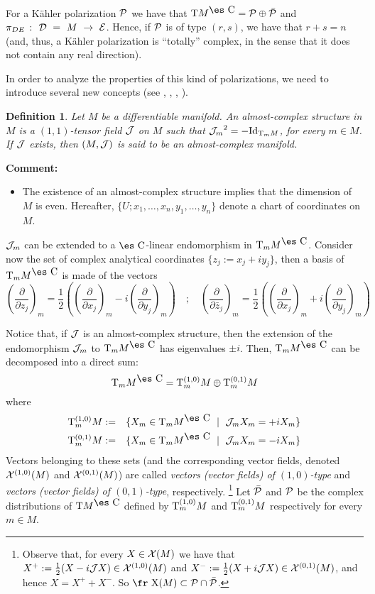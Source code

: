 \documentclass[12pt]{article}
\theoremstyle{plain}
\newtheorem{definition}{Definition}
\def\beann{\begin{eqnarray*}}
\def\eeann{\end{eqnarray*}}
\def\derpar#1#2{\frac{\partial{#1}}{\partial{#2}}}
\def\vf{\mbox{\fr X}}
\def\P{{\cal P}}
\def\D{{\cal D}}
\def\E{{\cal E}}
\def\Complex{\mbox{\es C}}
\def\Tan{{\rm T}}
\begin{document}
For a K\"ahler polarization $\P$ we have that
$\Tan M^{\Complex} = \P \oplus \bar \P$
and $\pi_{DE}~\colon~\D~=~M~\to~\E$.
Hence, if $\P$ is of type $(r,s)$,
we have that $r+s=n$
(and, thus, a K\"ahler polarization is ``totally'' complex,
in the sense that it does not contain any real direction).

In order to analyze the properties of this kind of polarizations,
we need to introduce several new concepts
(see \cite{GS-77}, \cite{Ib-90}, \cite{Ok-87}, \cite{Wo-80}).

\begin{definition}
Let $M$ be a differentiable manifold.
An {\rm almost-complex structure} in $M$ is a $(1,1)$-tensor field
${\cal J}$ on $M$
such that ${{\cal J}_m}^2=-{\rm Id}_{\Tan_m M}$, for every $m \in M$.
If ${\cal J}$ exists, then $(M,{\cal J})$ is said to be an
{\rm almost-complex manifold}.
\end{definition}

{\bf Comment:}
\begin{itemize}
\item
The existence of an almost-complex structure
implies that the dimension of $M$ is even.
Hereafter, $\{ U; x_1,\ldots ,x_n,y_1,\ldots ,y_n\}$
denote a chart of coordinates on $M$.
\end{itemize}

${\cal J}_m$ can be extended to a $\Complex$-linear endomorphism
in $\Tan_m M^{\Complex}$.
Consider now the set of complex analytical coordinates
$\{ z_j := x_j+iy_j \}$,
then a basis of $\Tan_m M^{\Complex}$ is made of the vectors
$$
\left(\derpar{}{z_j}\right)_m = \frac{1}{2} \left(
\left(\derpar{}{x_j}\right)_m -i\left(\derpar{}{y_j}\right)_m \right)
\quad ; \quad
\left(\derpar{}{\bar z_j}\right)_m = \frac{1}{2} \left(
\left(\derpar{}{x_j}\right)_m +i\left(\derpar{}{y_j}\right)_m \right)
$$

Notice that, if ${\cal J}$ is an almost-complex structure, then
the extension of the endomorphism ${\cal J}_m$ to
$\Tan_mM^{\Complex}$ has eigenvalues $\pm i$. Then, $\Tan_m
M^{\Complex}$ can be decomposed into a direct sum: $$ \Tan_m
M^{\Complex} = \Tan_m^{(1,0)} M \oplus \Tan_m^{(0,1)} M $$ where
\beann \Tan_m^{(1,0)}M&:=&\{X_m \in \Tan_m M^{\Complex}\ \mid \
{\cal J}_m X_m=+iX_m\}
\\
\Tan_m^{(0,1)}M&:=&\{X_m \in \Tan_m M^{\Complex}\ \mid \ {\cal J}_m
X_m=-iX_m\}
\eeann
Vectors belonging to these sets
(and the corresponding vector fields,
denoted ${\cal X}^{(1,0)}(M)$ and
${\cal X}^{(0,1)}(M)$) are called
{\it vectors (vector fields) of $(1,0)$-type}
and
{\it vectors (vector fields) of $(0,1)$-type},
respectively.%
\footnote{
Observe that, for every $X \in {\cal X}(M)$
we have that
$X^+ := \frac{1}{2}(X-i{\cal J}X) \in {\cal X}^{(1,0)}(M)$
and
$X^- := \frac{1}{2}(X+i{\cal J}X) \in {\cal X}^{(0,1)}(M)$,
and hence $X = X^+ + X^-$. So $\vf (M)\subset \P \cap \bar\P$.}
Let $\bar \P$ and $\P$ be the complex distributions of
$\Tan M^{\Complex}$ defined by
$\Tan_m^{(1,0)}M$ and $\Tan_m^{(0,1)}M$
respectively for every $m \in M$.
\end{document}
